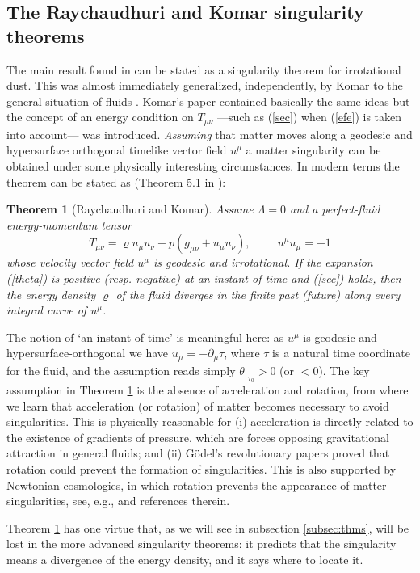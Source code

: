 \documentclass[12pt]{iopart}
\def\be{\begin{equation}}
\def\ee{\end{equation}}
\newtheorem{theorem}{Theorem}
\begin{document}
\subsection{The Raychaudhuri and Komar singularity theorems}\label{subsec:Ray-Kom}
The main result found in \cite{Ray} can be stated as a singularity theorem for irrotational dust. This was almost immediately generalized, independently, by Komar to the general situation of fluids \cite{K,Ray2}. Komar's paper contained basically
the same ideas but the concept of an energy
condition on $T_{\mu\nu}$ ---such as (\ref{sec}) when (\ref{efe}) is taken into account--- was introduced. {\it Assuming} that matter moves along a geodesic and hypersurface orthogonal timelike vector field $u^\mu$ a matter singularity can be obtained under some physically interesting circumstances. In modern terms the theorem can be stated as (Theorem 5.1 in \cite{S1}):
\begin{theorem}[Raychaudhuri and Komar]
Assume $\Lambda =0$ and a perfect-fluid energy-momentum tensor
\be
T_{\mu\nu}=\varrho u_{\mu}u_{\nu}+p(g_{\mu\nu}+u_\mu u_\nu), \hspace{1cm} u^\mu u_\mu =-1
\ee
whose velocity vector field 
$u^\mu$ is geodesic and irrotational. If the expansion (\ref{theta}) is
positive (resp. negative) at an instant of time and (\ref{sec})  holds, then the energy density $\varrho$ of the fluid diverges in
the finite past (future) along every integral curve of $u^\mu$.\label{th1}
\end{theorem}
The notion of `an instant of time' is meaningful here:  as $u^\mu$ is geodesic and hypersurface-orthogonal we have
$u_\mu =-\partial_\mu \tau$, where $\tau$ is a natural time coordinate for the fluid, and the assumption reads simply $\theta |_{\tau_0}>0$ (or $<0$). The key assumption in Theorem \ref{th1} is the absence of
acceleration and rotation, from where we learn that acceleration (or
rotation) of matter becomes necessary to avoid singularities. This is 
physically reasonable for (i) acceleration is directly related to the existence of gradients of pressure, which are forces
opposing gravitational attraction in general fluids; and (ii) G\" odel's revolutionary papers \cite{Go,Go1} proved that rotation could prevent the formation of singularities.  This is also
supported by Newtonian cosmologies, in which rotation prevents the
appearance of matter singularities, see, e.g., \cite{RSh} and references
therein. 

Theorem \ref{th1} has one virtue that, as we will see in subsection \ref{subsec:thms}, will be lost in the more advanced singularity theorems: it
predicts that the singularity means a divergence of the energy density, and it says where to locate it.
\end{document}
